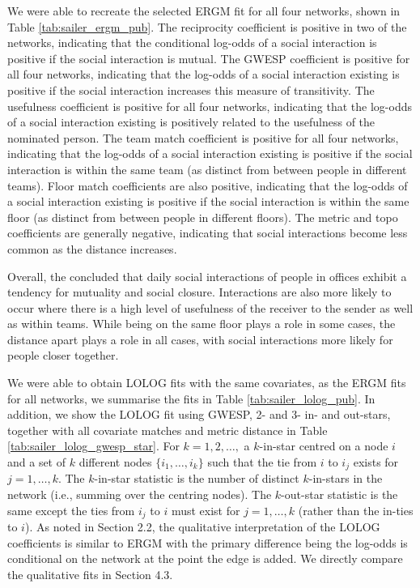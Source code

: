 \documentclass[
]{statsoc}
\begin{document}
We were able to recreate the selected ERGM fit for all four networks,
shown in Table \ref{tab:sailer_ergm_pub}. The reciprocity coefficient is
positive in two of the networks, indicating that the conditional
log-odds of a social interaction is positive if the social interaction
is mutual. The GWESP coefficient is positive for all four networks,
indicating that the log-odds of a social interaction existing is
positive if the social interaction increases this measure of
transitivity. The usefulness coefficient is positive for all four
networks, indicating that the log-odds of a social interaction existing
is positively related to the usefulness of the nominated person. The
team match coefficient is positive for all four networks, indicating
that the log-odds of a social interaction existing is positive if the
social interaction is within the same team (as distinct from between
people in different teams). Floor match coefficients are also positive,
indicating that the log-odds of a social interaction existing is
positive if the social interaction is within the same floor (as distinct
from between people in different floors). The metric and topo
coefficients are generally negative, indicating that social interactions
become less common as the distance increases.

Overall, the \cite{Sailer2012} concluded that daily social interactions
of people in offices exhibit a tendency for mutuality and social
closure. Interactions are also more likely to occur where there is a
high level of usefulness of the receiver to the sender as well as within
teams. While being on the same floor plays a role in some cases, the
distance apart plays a role in all cases, with social interactions more
likely for people closer together.

We were able to obtain LOLOG fits with the same covariates, as the ERGM
fits for all networks, we summarise the fits in Table
\ref{tab:sailer_lolog_pub}. In addition, we show the LOLOG fit using
GWESP, 2- and 3- in- and out-stars, together with all covariate matches
and metric distance in Table \ref{tab:sailer_lolog_gwesp_star}. For
\(k=1, 2, \ldots,\) a \(k\)-in-star centred on a node \(i\) and a set of
\(k\) different nodes \(\{i_1, \ldots, i_{k}\}\) such that the tie from
\(i\) to \(i_{j}\) exists for \(j=1, \ldots, k\). The \(k\)-in-star
statistic is the number of distinct \(k\)-in-stars in the network (i.e.,
summing over the centring nodes). The \(k\)-out-star statistic is the
same except the ties from \(i_{j}\) to \(i\) must exist for
\(j=1, \ldots, k\) (rather than the in-ties to \(i\)). As noted in
Section 2.2, the qualitative interpretation of the LOLOG coefficients is
similar to ERGM with the primary difference being the log-odds is
conditional on the network at the point the edge is added. We directly
compare the qualitative fits in Section 4.3.
\end{document}
